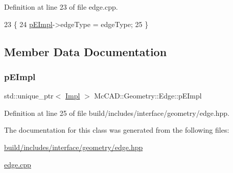Definition at line 23 of file edge.\+cpp.


\begin{DoxyCode}
23                                                        \{
24   \hyperlink{classMcCAD_1_1Geometry_1_1Edge_aefb1a25627999c87d4984bb505550626}{pEImpl}->edgeType = edgeType;
25 \}
\end{DoxyCode}


\subsection{Member Data Documentation}
\mbox{\label{classMcCAD_1_1Geometry_1_1Edge_aefb1a25627999c87d4984bb505550626}} 
\subsubsection{\texorpdfstring{p\+E\+Impl}{pEImpl}}
{\footnotesize\ttfamily std\+::unique\+\_\+ptr$<$ \hyperlink{classMcCAD_1_1Geometry_1_1Edge_1_1Impl}{Impl} $>$ Mc\+C\+A\+D\+::\+Geometry\+::\+Edge\+::p\+E\+Impl\hspace{0.3cm}{\ttfamily [private]}}



Definition at line 25 of file build/includes/interface/geometry/edge.\+hpp.



The documentation for this class was generated from the following files\+:\begin{DoxyCompactItemize}
\item 
\hyperlink{build_2includes_2interface_2geometry_2edge_8hpp}{build/includes/interface/geometry/edge.\+hpp}\item 
\hyperlink{edge_8cpp}{edge.\+cpp}\end{DoxyCompactItemize}
